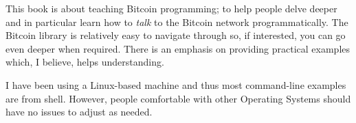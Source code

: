 This book is about teaching Bitcoin programming; to help people delve deeper and in particular learn how to \emph{talk} to the Bitcoin network programmatically. The Bitcoin library is relatively easy to navigate through so, if interested, you can go even deeper when required. There is an emphasis on providing practical examples which, I believe, helps understanding.

I have been using a Linux-based machine and thus most command-line examples are from  shell. However, people comfortable with other Operating Systems should have no issues to adjust as needed.
